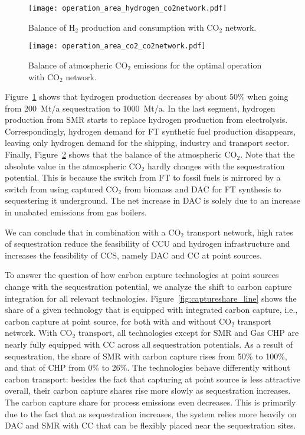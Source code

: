 \documentclass[conference]{IEEEtran}
\newcommand{\carbon}{CO$_2$}
\newcommand{\hydrogen}{H$_2$}
\begin{document}
\begin{figure}[h]
    \centering
    \texttt{[image: operation\_area\_hydrogen\_co2network.pdf]}
    \caption{Balance of \hydrogen{} production and consumption with \carbon{} network.}
    \label{fig:operation_area_hydrogen_co2network}
\end{figure}
%
\begin{figure}[h]
    \centering
    \texttt{[image: operation\_area\_co2\_co2network.pdf]}
    \caption{Balance of atmospheric \carbon{} emissions for the optimal operation with \carbon{} network.}
    \label{fig:operation_area_co2_co2network}
\end{figure}
%
Figure~\ref{fig:operation_area_hydrogen_co2network} shows that hydrogen production decreases by about 50\% when going from 200~Mt/a sequestration to 1000~Mt/a. In the last segment, hydrogen production from SMR starts to replace hydrogen production from electrolysis. Correspondingly, hydrogen demand for FT synthetic fuel production disappears, leaving only hydrogen demand for the shipping, industry and transport sector. Finally, Figure~\ref{fig:operation_area_co2_co2network} shows that the balance of the atmospheric \carbon{}. Note that the absolute value in the atmospheric \carbon{} hardly changes with the sequestration potential. This is because the switch from FT to fossil fuels is mirrored by a switch from using captured \carbon{} from biomass and DAC for FT synthesis to sequestering it underground. The net increase in DAC is solely due to an increase in unabated emissions from gas boilers.


We can conclude that in combination with a \carbon{} transport network, high rates of sequestration reduce the feasibility of CCU and hydrogen infrastructure and increases the feasibility of CCS, namely DAC and CC at point sources.

To answer the question of how carbon capture technologies at point sources change with the sequestration potential, we analyze the shift to carbon capture integration for all relevant technologies.
Figure~\ref{fig:captureshare_line} shows the share of a given technology that is equipped with integrated carbon capture, i.e., carbon capture at point source, for both with and without \carbon{} transport network.
With \carbon{} transport, all technologies except for SMR and Gas CHP are nearly fully equipped with CC across all sequestration potentials. As a result of sequestration, the share of SMR with carbon capture rises from 50\% to 100\%, and that of CHP from 0\% to 26\%. The technologies behave differently without carbon transport: besides the fact that capturing at point source is less attractive overall, their carbon capture shares rise more slowly as sequestration increases. The carbon capture share for process emissions even decreases. This is primarily due to the fact that as sequestration increases, the system relies more heavily on DAC and SMR with CC that can be flexibly placed near the sequestration sites.
\end{document}
